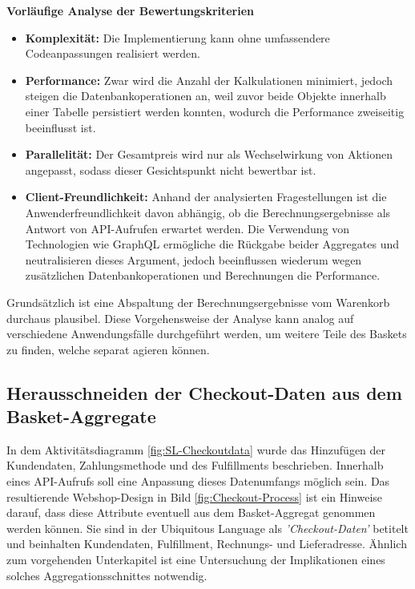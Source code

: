 \textbf{Vorläufige Analyse der Bewertungskriterien}

\begin{itemize}[topsep=-2pt]
	\item \textbf{Komplexität: } { Die Implementierung kann ohne umfassendere Codeanpassungen realisiert werden. }
	\item \textbf{Performance: } { Zwar wird die Anzahl der Kalkulationen minimiert, jedoch steigen die Datenbankoperationen an, weil zuvor beide Objekte innerhalb einer Tabelle persistiert werden konnten, wodurch die Performance zweiseitig beeinflusst ist. }
	\item \textbf{Parallelität: } { Der Gesamtpreis wird nur als Wechselwirkung von Aktionen angepasst, sodass dieser Gesichtspunkt nicht bewertbar ist. }
	\item \textbf{Client-Freundlichkeit: } { Anhand der analysierten Fragestellungen ist die Anwenderfreundlichkeit davon abhängig, ob die Berechnungsergebnisse als Antwort von API-Aufrufen erwartet werden. Die Verwendung von Technologien wie GraphQL ermögliche die Rückgabe beider Aggregates und neutralisieren dieses Argument, jedoch beeinflussen wiederum wegen zusätzlichen Datenbankoperationen und Berechnungen die Performance. }
\end{itemize}

Grundsätzlich ist eine Abspaltung der Berechnungsergebnisse vom Warenkorb durchaus plausibel. Diese Vorgehensweise der Analyse kann analog auf verschiedene Anwendungsfälle durchgeführt werden, um weitere Teile des Baskets zu finden, welche separat agieren können. 

\subsection{Herausschneiden der Checkout-Daten aus dem Basket-Aggregate}

In dem Aktivitätsdiagramm \ref{fig:SL-Checkoutdata} wurde das Hinzufügen der Kundendaten, Zahlungsmethode und des Fulfillments beschrieben. Innerhalb eines API-Aufrufs soll eine Anpassung dieses Datenumfangs möglich sein. Das resultierende Webshop-Design in Bild \ref{fig:Checkout-Process} ist ein Hinweise darauf, dass diese Attribute eventuell aus dem Basket-Aggregat genommen werden können. Sie sind in der Ubiquitous Language als \emph{'Checkout-Daten'} betitelt und beinhalten Kundendaten, Fulfillment, Rechnungs- und Lieferadresse. Ähnlich zum vorgehenden Unterkapitel ist eine Untersuchung der Implikationen eines solches Aggregationsschnittes notwendig.

